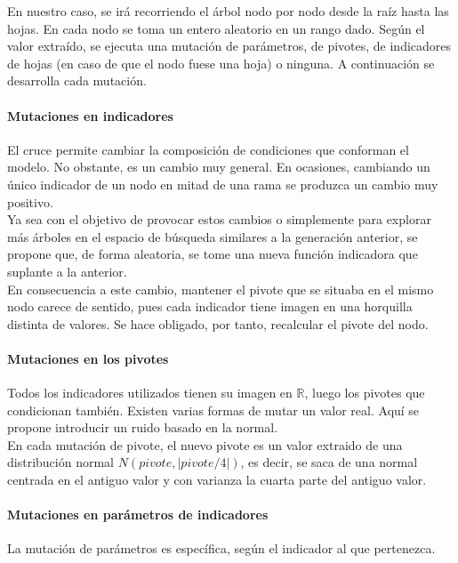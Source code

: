  En nuestro caso, se ir\'a recorriendo el \'arbol nodo por nodo desde la ra\'iz hasta las hojas. En cada nodo se toma un entero aleatorio en un rango dado. Seg\'un el valor extra\'ido, se ejecuta una mutaci\'on de par\'ametros, de pivotes, de indicadores de hojas (en caso de que el nodo fuese una hoja) o ninguna. A continuaci\'on se desarrolla cada mutaci\'on.\\

\paragraph{Mutaciones en indicadores}
El cruce permite cambiar la composici\'on de condiciones que conforman el modelo. No obstante, es un cambio muy general. En ocasiones, cambiando un \'unico indicador de un nodo en mitad de una rama se produzca un cambio muy positivo.\\

Ya sea con el objetivo de provocar estos cambios o simplemente para explorar m\'as \'arboles en el espacio de b\'usqueda similares a la generaci\'on anterior, se propone que, de forma aleatoria, se tome una nueva funci\'on indicadora que suplante a la anterior. \\

En consecuencia a este cambio, mantener el pivote que se situaba en el mismo nodo carece de sentido, pues cada indicador tiene imagen en una horquilla distinta de valores. Se hace obligado, por tanto, recalcular el pivote del nodo.\\  

\paragraph{Mutaciones en los pivotes}

Todos los indicadores utilizados tienen su imagen en $\mathbb{R}$, luego los pivotes que condicionan tambi\'en. Existen varias formas de mutar un valor real. Aqu\'i se propone introducir un ruido basado en la normal.\\

En cada mutaci\'on de pivote, el nuevo pivote es un valor extraido de una distribuci\'on normal $N(pivote, |pivote/4|)$, es decir, se saca de una normal centrada en el antiguo valor y con varianza la cuarta parte del antiguo valor.\\

\paragraph{Mutaciones en par\'ametros de indicadores}
La mutaci\'on de par\'ametros es espec\'ifica, seg\'un el indicador al que pertenezca.\\

